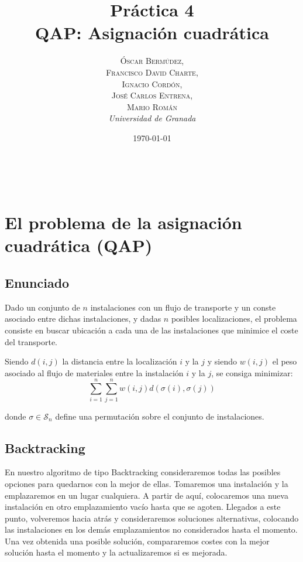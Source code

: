 \documentclass[a4paper, 11pt]{article} %
\title{\textbf{Práctica 4}\\ %
QAP: Asignación cuadrática} %
\author{\textsc{Óscar Bermúdez,\\Francisco David Charte,\\Ignacio Cordón,\\José Carlos Entrena,\\Mario Román} %
\\{\textit{Universidad de Granada}}} %
\date{\today} %
\makeatletter
\renewcommand{\maketitle}{ %
\begin{flushright} %
{\LARGE\@title} %

\vspace{50pt} %

{\large\@author} %
\\\@date %

\vspace{40pt} %
\end{flushright}
}
\makeatother
\begin{document}
\maketitle %

\renewcommand{\abstractname}{Resumen} %
\begin{abstract}
\end{abstract}
{\parskip=2pt
\tableofcontents
}
\pagebreak

  \section{El problema de la asignación cuadrática (QAP)}
    \subsection{Enunciado}
      Dado un conjunto de $n$ instalaciones con un flujo de transporte y
      un conste asociado entre dichas instalaciones, y dadas $n$ posibles localizaciones,
      el problema consiste en buscar ubicación a cada una de las instalaciones que
      minimice el coste del transporte.
      
      Siendo $d(i,j)$ la distancia entre la localización $i$ y la $j$
      y siendo $w(i,j)$ el peso asociado al flujo de materiales entre la instalación
      $i$ y la $j$, se consiga minimizar:
      \begin{equation}
      \sum_{i=1}^n \sum_{j=1}^nw(i,j) d(\sigma(i),\sigma(j))
      \label{coste}
      \end{equation}

      donde $\sigma \in \mathcal{S}_n$ define una permutación sobre el conjunto de instalaciones.


    \subsection{Backtracking}
      En nuestro algoritmo de tipo Backtracking consideraremos todas las posibles opciones para quedarnos con la mejor de ellas.
      Tomaremos una instalación y la emplazaremos en un lugar cualquiera. A partir de aquí, colocaremos una nueva instalación
      en otro emplazamiento vacío hasta que se agoten. Llegados a este punto, volveremos hacia atrás y consideraremos soluciones
      alternativas, colocando las instalaciones en los demás emplazamientos no considerados hasta el momento. Una vez obtenida una
      posible solución, compararemos costes con la mejor solución hasta el momento y la actualizaremos si es mejorada.       
      
\end{document}
